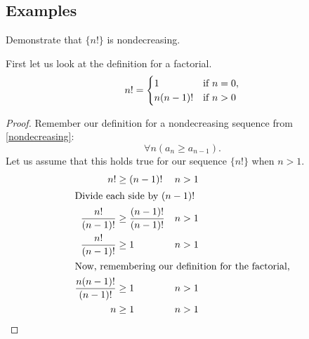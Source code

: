 \subsection{Examples}
\begin{ex}
  Demonstrate that $\{n!\}$ is nondecreasing.
  \begin{sol}
    First let us look at the definition for a factorial.
    \begin{equation}\label{eq:factorial}\index{factorial}
      n! =
      \begin{cases}
        1 & \text{if } n = 0, \\
        n(n-1)! & \text{if } n > 0
      \end{cases}
    \end{equation}
    \begin{proof}
      Remember our definition for a nondecreasing sequence from \ref{nondecreasing}:
      \[\forall n (a_n \geq a_{n-1})\text{.}\]
      Let us assume that this holds true for our sequence $\{n!\}$ when $n>1$.
      \begin{align*}
        n!&\geq(n-1)!& n&>1 \\
        \intertext{Divide each side by $(n-1)!$}
        \frac{n!}{(n-1)!}&\geq \frac{(n-1)!}{(n-1)!} &n&>1 \\
        \frac{n!}{(n-1)!}&\geq 1 &n&>1 \\
        \intertext{Now, remembering our definition for the factorial,}
        \frac{n(n-1)!}{(n-1)!}&\geq 1 &n&>1 \\
        n&\geq1 &n&>1\qedhere
      \end{align*}
    \end{proof}
  \end{sol}
\end{ex}
